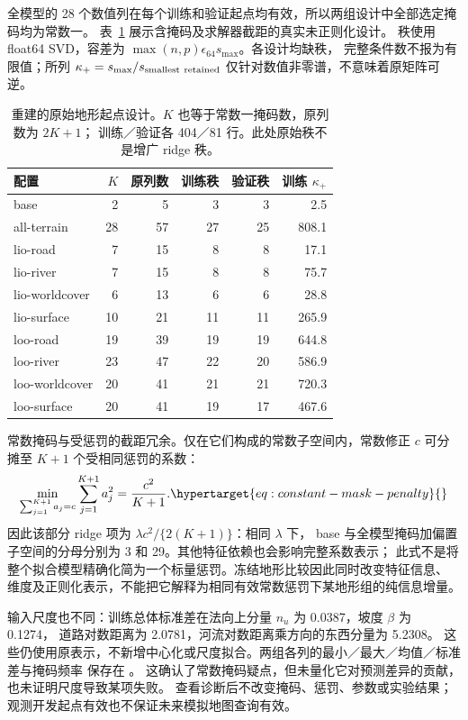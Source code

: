 全模型的 28 个数值列在每个训练和验证起点均有效，所以两组设计中全部选定掩码均为常数一。
表~\ref{tab:raw-terrain-design} 展示含掩码及求解器截距的真实未正则化设计。
秩使用 float64 SVD，容差为 \(\max(n,p)\epsilon_{64}s_{\max}\)。各设计均缺秩，
完整条件数不报为有限值；所列 \(\kappa_{+}=s_{\max}/s_{\rm smallest\ retained}\)
仅针对数值非零谱，不意味着原矩阵可逆。

\begin{table}[htbp]
\centering\small
\caption{重建的原始地形起点设计。\(K\) 也等于常数一掩码数，原列数为 \(2K+1\)；
训练／验证各 404／81 行。此处原始秩不是增广 ridge 秩。}
\label{tab:raw-terrain-design}\hypertarget{tab:raw-terrain-design}{}
\begin{tabular}{lrrrrr}
\toprule
配置 & \(K\) & 原列数 & 训练秩 & 验证秩 & 训练 \(\kappa_{+}\)\\
\midrule
base & 2 & 5 & 3 & 3 & 2.5\\
all-terrain & 28 & 57 & 27 & 25 & 808.1\\
lio-road & 7 & 15 & 8 & 8 & 17.1\\
lio-river & 7 & 15 & 8 & 8 & 75.7\\
lio-worldcover & 6 & 13 & 6 & 6 & 28.8\\
lio-surface & 10 & 21 & 11 & 11 & 265.9\\
loo-road & 19 & 39 & 19 & 19 & 644.8\\
loo-river & 23 & 47 & 22 & 20 & 586.9\\
loo-worldcover & 20 & 41 & 21 & 21 & 720.3\\
loo-surface & 20 & 41 & 19 & 17 & 467.6\\
\bottomrule
\end{tabular}
\end{table}

常数掩码与受惩罚的截距冗余。仅在它们构成的常数子空间内，常数修正 \(c\)
可分摊至 \(K+1\) 个受相同惩罚的系数：
\begin{equation}
\min_{\sum_{j=1}^{K+1}a_j=c}\sum_{j=1}^{K+1}a_j^2=\frac{c^2}{K+1}.
\label{eq:constant-mask-penalty}\hypertarget{eq:constant-mask-penalty}{}
\end{equation}
因此该部分 ridge 项为 \(\lambda c^2/\{2(K+1)\}\)：相同 \(\lambda\) 下，
base 与全模型掩码加偏置子空间的分母分别为 3 和 29。其他特征依赖也会影响完整系数表示；
此式不是将整个拟合模型精确化简为一个标量惩罚。冻结地形比较因此同时改变特征信息、
维度及正则化表示，不能把它解释为相同有效常数惩罚下某地形组的纯信息增量。

\noindent\parbox{\linewidth}{
输入尺度也不同：训练总体标准差在法向上分量 \(n_u\) 为 0.0387，坡度 \(\beta\) 为 0.1274，
道路对数距离为 2.0781，河流对数距离乘方向的东西分量为 5.2308。
这些仍使用原表示，不新增中心化或尺度拟合。两组各列的最小／最大／均值／标准差与掩码频率
保存在 。
这确认了常数掩码疑点，但未量化它对预测差异的贡献，也未证明尺度导致某项失败。
查看诊断后不改变掩码、惩罚、参数或实验结果；观测开发起点有效也不保证未来模拟地图查询有效。
}

